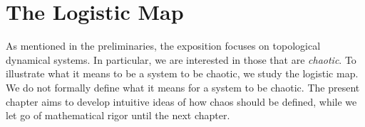 \documentclass[10pt,twoside,draft]{book}
\begin{document}
\chapter{The Logistic Map}
\label{chap:intro}
As mentioned in the preliminaries, the exposition focuses on topological dynamical systems.
In particular, we are interested in those that are \textit{chaotic}.
To illustrate what it means to be a system to be chaotic, we study the logistic map.
We do not formally define what it means for a system to be chaotic.
The present chapter aims to develop intuitive ideas of how chaos should be defined, while we let go of mathematical rigor until the next chapter.

\end{document}
